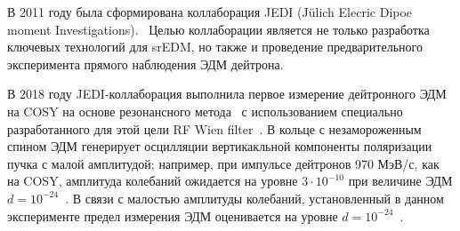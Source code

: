 В 2011 году была сформирована коллаборация JEDI (J\"ulich Elecric Dipoe moment Investigations).~\cite{JEDI:Website} 
Целью коллаборации является не только разработка ключевых технологий для srEDM, но также и проведение предварительного эксперимента прямого наблюдения ЭДМ дейтрона. 

В 2018 году JEDI-коллаборация выполнила первое измерение дейтронного ЭДМ на COSY на основе резонансного метода~\cite{COSY:Partially-Frozen-Spin, COSY:SpinTuneMapping} 
с использованием специально разработанного для этой цели RF Wien filter~\cite{JSlim:RFWF:Design, JSlim:RFWF:Commisioning}. 
В кольце с незамороженным спином 
ЭДМ генерирует осцилляции вертикакльной компоненты поляризации пучка с малой амплитудой; например, 
при импульсе дейтронов 970 МэВ/с, как на COSY, амплитуда колебаний ожидается на уровне 
$3\cdot10^{-10}$ при величине ЭДМ $d = 10^{-24}$~\ecm. В связи с малостью амплитуды колебаний, установленный в данном эксперименте предел измерения ЭДМ оценивается на уровне $d=10^{-24}$~\ecm.
